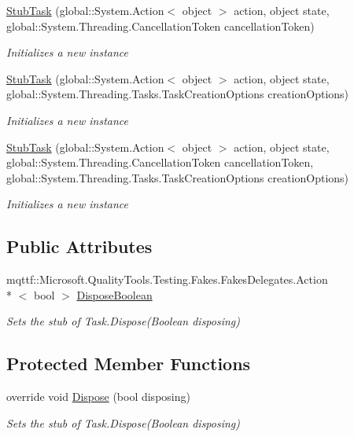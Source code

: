 \begin{DoxyCompactItemize}
\hyperlink{class_system_1_1_threading_1_1_tasks_1_1_fakes_1_1_stub_task_ace1158602427b647f47d99a48c43676f}{Stub\-Task} (global\-::\-System.\-Action$<$ object $>$ action, object state, global\-::\-System.\-Threading.\-Cancellation\-Token cancellation\-Token)
\begin{DoxyCompactList}\small\item\em Initializes a new instance\end{DoxyCompactList}\item 
\hyperlink{class_system_1_1_threading_1_1_tasks_1_1_fakes_1_1_stub_task_aa06babf7dd129a36ad09db9da4603027}{Stub\-Task} (global\-::\-System.\-Action$<$ object $>$ action, object state, global\-::\-System.\-Threading.\-Tasks.\-Task\-Creation\-Options creation\-Options)
\begin{DoxyCompactList}\small\item\em Initializes a new instance\end{DoxyCompactList}\item 
\hyperlink{class_system_1_1_threading_1_1_tasks_1_1_fakes_1_1_stub_task_ad4947b315b3fb7ef240163ec6338a3a9}{Stub\-Task} (global\-::\-System.\-Action$<$ object $>$ action, object state, global\-::\-System.\-Threading.\-Cancellation\-Token cancellation\-Token, global\-::\-System.\-Threading.\-Tasks.\-Task\-Creation\-Options creation\-Options)
\begin{DoxyCompactList}\small\item\em Initializes a new instance\end{DoxyCompactList}\end{DoxyCompactItemize}
\subsection*{Public Attributes}
\begin{DoxyCompactItemize}
\item 
mqttf\-::\-Microsoft.\-Quality\-Tools.\-Testing.\-Fakes.\-Fakes\-Delegates.\-Action\\*
$<$ bool $>$ \hyperlink{class_system_1_1_threading_1_1_tasks_1_1_fakes_1_1_stub_task_a18c323ef87134dd9fef0ad4f271789a5}{Dispose\-Boolean}
\begin{DoxyCompactList}\small\item\em Sets the stub of Task.\-Dispose(\-Boolean disposing)\end{DoxyCompactList}\end{DoxyCompactItemize}
\subsection*{Protected Member Functions}
\begin{DoxyCompactItemize}
\item 
override void \hyperlink{class_system_1_1_threading_1_1_tasks_1_1_fakes_1_1_stub_task_a7d5a72b62b7ce2e7e4cb5c32492d5479}{Dispose} (bool disposing)
\begin{DoxyCompactList}\small\item\em Sets the stub of Task.\-Dispose(\-Boolean disposing)\end{DoxyCompactList}\end{DoxyCompactItemize}
